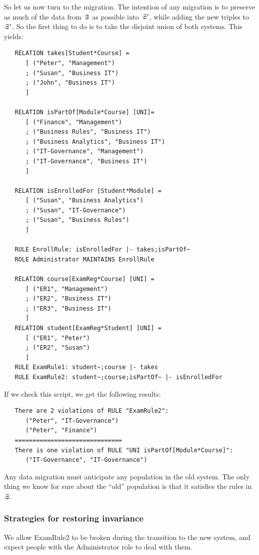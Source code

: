\documentclass{elsarticle}
\begin{document}
   So let us now turn to the migration.
   The intention of any migration is to preserve as much of the data from $\mathfrak{S}$ as possible into $\mathfrak{S}'$,
   while adding the new triples to $\mathfrak{S}'$.
   So the first thing to do is to take the disjoint union of both systems.
   This yields:
\begin{verbatim}
   RELATION takes[Student*Course] =
      [ ("Peter", "Management")
      ; ("Susan", "Business IT")
      ; ("John", "Business IT")
      ]
   
   RELATION isPartOf[Module*Course] [UNI]=
      [ ("Finance", "Management")
      ; ("Business Rules", "Business IT")
      ; ("Business Analytics", "Business IT")
      ; ("IT-Governance", "Management")
      ; ("IT-Governance", "Business IT")
      ]
   
   RELATION isEnrolledFor [Student*Module] =
      [ ("Susan", "Business Analytics")
      ; ("Susan", "IT-Governance")
      ; ("Susan", "Business Rules")
      ]
   
   RULE EnrollRule: isEnrolledFor |- takes;isPartOf~
   ROLE Administrator MAINTAINS EnrollRule
   
   RELATION course[ExamReg*Course] [UNI] =
      [ ("ER1", "Management")
      ; ("ER2", "Business IT")
      ; ("ER3", "Business IT")
      ]
   RELATION student[ExamReg*Student] [UNI] =
      [ ("ER1", "Peter")
      ; ("ER2", "Susan")
      ]
   RULE ExamRule1: student~;course |- takes
   RULE ExamRule2: student~;course;isPartOf~ |- isEnrolledFor
\end{verbatim}
   If we check this script, we get the following results:
\begin{verbatim}
   There are 2 violations of RULE "ExamRule2":
      ("Peter", "IT-Governance")
      ("Peter", "Finance")
   ==============================
   There is one violation of RULE "UNI isPartOf[Module*Course]":
      ("IT-Governance", "IT-Governance")
\end{verbatim}
   Any data migration must anticipate any population in the old system.
   The only thing we know for sure about the ``old'' population is that it satisfies the rules in $\mathfrak{S}$.

\subsubsection{Strategies for restoring invariance}

We allow ExamRule2 to be broken during the transition to the new system, and expect people with the Administrator role to deal with them.
\end{document}

